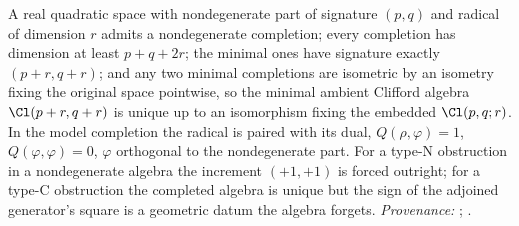 A real quadratic space with nondegenerate part of signature $(p,q)$ and radical of dimension $r$ admits a nondegenerate completion; every completion has dimension at least $p + q + 2r$; the minimal ones have signature exactly $(p+r, q+r)$; and any two minimal completions are isometric by an isometry fixing the original space pointwise, so the minimal ambient Clifford algebra $\Cl(p+r, q+r)$ is unique up to an isomorphism fixing the embedded $\Cl(p,q;r)$. In the model completion the radical is paired with its dual, $Q(\rho, \varphi) = 1$, $Q(\varphi,\varphi) = 0$, $\varphi$ orthogonal to the nondegenerate part. For a type-N obstruction in a nondegenerate algebra the increment $(+1,+1)$ is forced outright; for a type-C obstruction the completed algebra is unique but the sign of the adjoined generator's square is a geometric datum the algebra forgets. \emph{Provenance:} \cite[Thm.~2.3 and its model]{ButlerT2}; \cite[Thm.~4.13, Thm.~5.7 and Rem.~5.8]{ButlerT1}.
